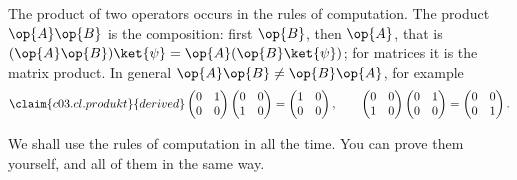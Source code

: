 The product of two operators occurs in the rules of computation. The product $\op{A}\op{B}$ is
the composition: first $\op{B}$, then $\op{A}$, that is
$(\op{A}\op{B})\ket{\psi} = \op{A}(\op{B}\ket{\psi})$; for matrices it is the matrix product.
In general $\op{A}\op{B} \neq \op{B}\op{A}$, for example
\begin{equation}\label{c03.eq.produkt}\claim{c03.cl.produkt}{derived}
  \begin{pmatrix} 0 & 1 \\ 0 & 0 \end{pmatrix} \begin{pmatrix} 0 & 0 \\ 1 & 0 \end{pmatrix}
  = \begin{pmatrix} 1 & 0 \\ 0 & 0 \end{pmatrix} ,
  \qquad
  \begin{pmatrix} 0 & 0 \\ 1 & 0 \end{pmatrix} \begin{pmatrix} 0 & 1 \\ 0 & 0 \end{pmatrix}
  = \begin{pmatrix} 0 & 0 \\ 0 & 1 \end{pmatrix} .
\end{equation}

We shall use the rules of computation in  all the time. You can prove them yourself,
and all of them in the same way.

